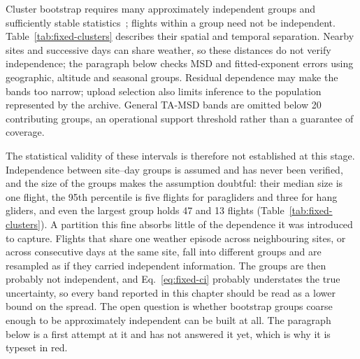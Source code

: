 Cluster bootstrap requires many approximately independent groups and sufficiently
stable statistics~\cite{cameron_miller2015}; flights within a group need not be
independent. Table~\ref{tab:fixed-clusters} describes their spatial and temporal
separation. Nearby sites and successive days can share weather, so these distances
do not verify independence; the paragraph below checks MSD and fitted-exponent errors using geographic,
altitude and seasonal groups. Residual dependence may make the bands
too narrow; upload selection also limits inference to the population represented
by the archive. General TA-MSD bands are omitted below 20 contributing groups, an
operational support threshold rather than a guarantee of coverage.

The statistical validity of these intervals is therefore not established at this
stage. Independence between site--day groups is assumed and has never been verified,
and the size of the groups makes the assumption doubtful: their median size is one
flight, the 95th percentile is five flights for paragliders and three for hang
gliders, and even the largest group holds 47 and 13 flights
(Table~\ref{tab:fixed-clusters}). A partition this fine absorbs little of the
dependence it was introduced to capture. Flights that share one weather episode
across neighbouring sites, or across consecutive days at the same site, fall into
different groups and are resampled as if they carried independent information. The
groups are then probably not independent, and Eq.~\eqref{eq:fixed-ci} probably
understates the true uncertainty, so every band reported in this chapter should be
read as a lower bound on the spread. The open question is whether bootstrap groups
coarse enough to be approximately independent can be built at all. The paragraph
below is a first attempt at it and has not answered it yet, which is why it is
typeset in red.

\begin{table}[htbp]
 \centering\small\setlength{\tabcolsep}{4pt}
 
 \caption{Site--day diagnostics in the main cohort. Distances refer to the nearest
 other catalogue site represented on the same date; time gaps refer to the previous
 observed date at the same site. Distances and time gaps are reported as median
 [10th, 90th percentile].
 Cohort group counts are in Table~\ref{tab:fixed-cohorts}.}
 \label{tab:fixed-clusters}
\end{table}

